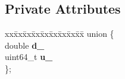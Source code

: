 \subsection*{Private Attributes}
\begin{DoxyCompactItemize}
\item 
\begin{tabbing}
xx\=xx\=xx\=xx\=xx\=xx\=xx\=xx\=xx\=\kill
union \{\\
\>double {\bfseries d\_}\\
\>uint64\_t {\bfseries u\_}\\
\}; \hypertarget{classinternal_1_1_double_a675cba8aa1d2f3b2387a8067cee004ec}{}\label{classinternal_1_1_double_a675cba8aa1d2f3b2387a8067cee004ec}
\\

\end{tabbing}\end{DoxyCompactItemize}
